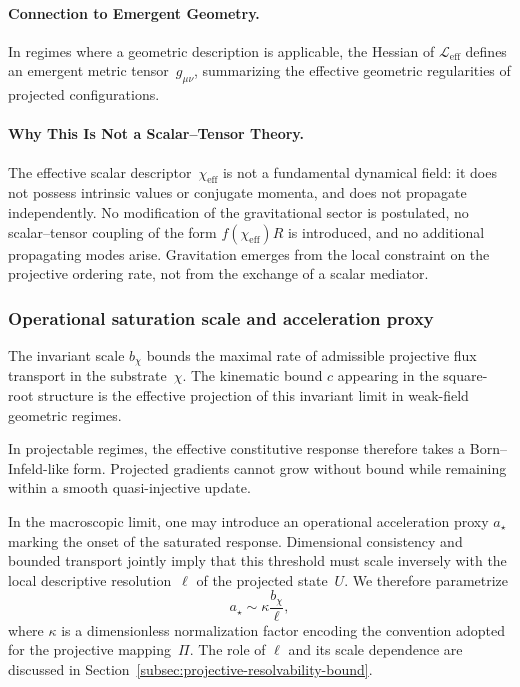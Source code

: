   \paragraph*{Connection to Emergent Geometry.}
    In regimes where a geometric description is applicable, the Hessian of
    $\mathcal{L}_{\text{eff}}$ defines an emergent metric tensor~$g_{\mu\nu}$,
    summarizing the effective geometric regularities of projected configurations.

  \paragraph*{Why This Is Not a Scalar--Tensor Theory.}
    \label{subsec:not-scalar-tensor}
    The effective scalar descriptor~$\chi_{\mathrm{eff}}$ is not a fundamental
    dynamical field: it does not possess intrinsic values or conjugate momenta,
    and does not propagate independently.
    No modification of the gravitational sector is postulated, no
    scalar--tensor coupling of the form $f(\chi_{\mathrm{eff}}) R$ is
    introduced, and no additional propagating modes arise.
    Gravitation emerges from the local constraint on the projective ordering
    rate, not from the exchange of a scalar mediator.

\subsubsection*{Operational saturation scale and acceleration proxy}
  \label{subsubsec:operational_saturation_scale_wp}

  The invariant scale $b_{\chi}$ bounds the maximal rate of admissible
  projective flux transport in the substrate~$\chi$.
  The kinematic bound $c$ appearing in the square-root structure is the
  effective projection of this invariant limit in weak-field geometric
  regimes.

  In projectable regimes, the effective constitutive response therefore
  takes a Born--Infeld-like form.
  Projected gradients cannot grow without bound while remaining within a
  smooth quasi-injective update.

  In the macroscopic limit, one may introduce an operational acceleration
  proxy $a_\star$ marking the onset of the saturated response.
  Dimensional consistency and bounded transport jointly imply that this
  threshold must scale inversely with the local descriptive resolution~$\ell$
  of the projected state~$U$.
  We therefore parametrize
  \begin{equation}
    a_\star \sim \kappa \frac{b_{\chi}}{\ell},
  \end{equation}
  where $\kappa$ is a dimensionless normalization factor encoding the
  convention adopted for the projective mapping~$\Pi$.
  The role of $\ell$ and its scale dependence are discussed in
  Section~\ref{subsec:projective-resolvability-bound}.
